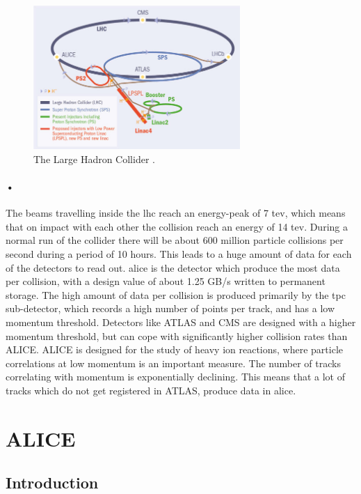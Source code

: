 \documentclass[a4paper, 12pt, openright, twoside]{report}
\begin{document}
\begin{figure}[h!]
  \centering
    \includegraphics[width=0.7\textwidth]{images/lhc-ring.jpg}
     \caption[The Large Hadron Collider]{The Large Hadron Collider \cite{lhc-ring-image}.}
    \label{fig:lhc}
\end{figure}

\paragraph{•}
The beams travelling inside the \gls{lhc} reach an energy-peak of 7 \gls{tev}, which means that on impact with each other the collision reach an energy of 14 \gls{tev}\cite{lhc-pdf}.
During a normal run of the collider there will be about 600 million particle collisions per second during a period of 10 hours.
This leads to a huge amount of data for each of the detectors to read out.
\gls{alice} is the detector which produce the most data per collision, with a design value of about 1.25 GB/s written to permanent storage.
The high amount of data per collision is produced primarily by the \gls{tpc} sub-detector, which records a high number of points per track, and has a low momentum threshold. Detectors like ATLAS and CMS  are designed with a higher momentum threshold, but can cope with significantly higher collision rates than ALICE.
ALICE is designed for the study of heavy ion reactions, where particle correlations at low momentum is an important measure.
The number of tracks correlating with momentum is exponentially declining.
This means that a lot of tracks which do not get registered in ATLAS, produce data in \gls{alice}.

\section{ALICE}
\subsection{Introduction}
\end{document}
